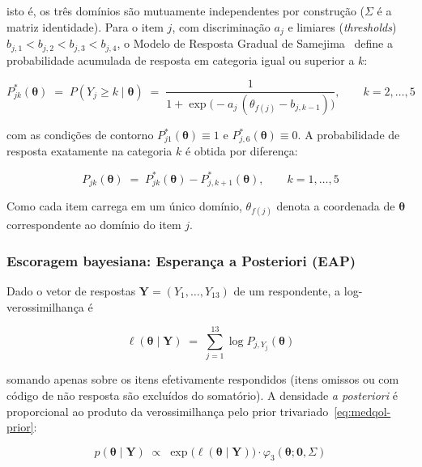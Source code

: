\documentclass[12pt,a4paper]{article}
\begin{document}
isto é, os três domínios são mutuamente independentes por construção
($\Sigma$ é a matriz identidade). Para o item $j$, com discriminação $a_j$ e
limiares (\emph{thresholds}) $b_{j,1} < b_{j,2} < b_{j,3} < b_{j,4}$, o Modelo
de Resposta Gradual de Samejima~\cite{samejima1969} define a probabilidade
acumulada de resposta em categoria igual ou superior a $k$:

\begin{equation}
P^*_{jk}(\boldsymbol{\theta}) \;=\; P(Y_j \geq k \mid \boldsymbol{\theta})
\;=\; \frac{1}{1 + \exp\!\big(-a_j\,(\theta_{f(j)} - b_{j,k-1})\big)},
\qquad k = 2, \dots, 5
\label{eq:medqol-cumulative}
\end{equation}

com as condições de contorno $P^*_{j1}(\boldsymbol{\theta}) \equiv 1$ e
$P^*_{j,6}(\boldsymbol{\theta}) \equiv 0$. A probabilidade de resposta exatamente
na categoria $k$ é obtida por diferença:

\begin{equation}
P_{jk}(\boldsymbol{\theta}) \;=\; P^*_{jk}(\boldsymbol{\theta}) - P^*_{j,k+1}(\boldsymbol{\theta}),
\qquad k = 1, \dots, 5
\label{eq:medqol-category}
\end{equation}

Como cada item carrega em um único domínio, $\theta_{f(j)}$ denota a
coordenada de $\boldsymbol{\theta}$ correspondente ao domínio do item $j$.

\subsubsection{Escoragem bayesiana: Esperança a Posteriori (EAP)}

Dado o vetor de respostas $\mathbf{Y} = (Y_1, \dots, Y_{13})$ de um
respondente, a log-verossimilhança é

\begin{equation}
\ell(\boldsymbol{\theta} \mid \mathbf{Y}) \;=\; \sum_{j=1}^{13} \log P_{j,Y_j}(\boldsymbol{\theta})
\label{eq:medqol-loglik}
\end{equation}

somando apenas sobre os itens efetivamente respondidos (itens omissos ou com
código de não resposta são excluídos do somatório). A densidade \emph{a
posteriori} é proporcional ao produto da verossimilhança pelo prior
trivariado~\eqref{eq:medqol-prior}:

\begin{equation}
p(\boldsymbol{\theta} \mid \mathbf{Y}) \;\propto\;
\exp\!\big(\ell(\boldsymbol{\theta}\mid\mathbf{Y})\big) \cdot
\varphi_3(\boldsymbol{\theta}; \mathbf{0}, \Sigma)
\label{eq:medqol-posterior}
\end{equation}
\end{document}

